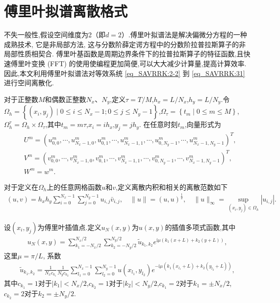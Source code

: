 \section{傅里叶拟谱离散格式}\label{Section_SAVRRK: 3}
不失一般性,假设空间维度为2（即$d=2$）.傅里叶拟谱法是解决偏微分方程的一种成熟技术, 它是非局部方法,
这与分数阶薛定谔方程中的分数阶拉普拉斯算子的非局部性质相契合.
傅里叶基函数是周期边界条件下的拉普拉斯算子的特征函数,且快速傅里叶变换 (FFT) 的使用使编程更加简便,可以大大减少计算量,提高计算效率.
因此,本文利用傅里叶拟谱法对等效系统 \eqref{eq_SAVRRK:2-2} 到 \eqref{eq_SAVRRK:31} 进行空间离散化.


对于正整数$M$和偶数正整数$N_{x}$、$N_{y}$,定义$\tau={T}/{M}$,$h_{x}={L}/{N_{x}}$,$h_{y}={L}/{N_{y}}$.令$\Omega_{h}=\left\{(x_{i}, y_{j}) \mid 0 \leq i \leq N_x-1;0 \leq j \leq N_y-1\right\}$,$\Omega_{\tau}=\left\{t_{m} \mid 0 \leq m \leq M\right\}$,$\Omega_{h}^{\tau}=\Omega_{h} \times \Omega_{\tau}$,其中$t_{m}=m \tau$,$x_{i}=i h_{x}$,$y_{j}=j h_{y}$.
在任意时刻$t_m$,向量形式为
\begin{align}\label{eq_SAVRRK:47}
&U^m=\left(u_{0,0}^m, \cdots, u_{N_{x}-1,0}^m, u_{0,1}^m, \cdots, u_{N_{x}-1,1}^m, \cdots, u_{0, N_{y}-1}^m, \cdots, u_{N_{x}-1, N_{y}-1}^m\right)^{T},\\
&V^m=\left(v_{0,0}^m, \cdots, v_{N_{x}-1,0}^m, v_{0,1}^m, \cdots, v_{N_{x}-1,1}^m, \cdots, v_{0, N_{y}-1}^m, \cdots, v_{N_{x}-1, N_{y}-1}^m\right)^{T},\\
&W^m=w^m.
\end{align}

对于定义在$\Omega_{h}$上的任意网格函数$u$和$v$,定义离散内积和相关的离散范数如下
\begin{align}\label{eq_SAVRRK:48}
(u, v)=h_{x} h_{y} \sum_{i=0}^{N_{x}-1} \sum_{j=0}^{N_{y}-1} u_{i, j} \bar{v}_{i, j},\quad\|u\|=(u, u)^{\frac{1}{2}},\quad\|u\|_{\infty}=\sup _{\left(x_{i}, y_{j}\right) \in \Omega_{h}}\left|u_{i, j}\right|.
\end{align}

设$\left(x_{i}, y_{j}\right)$为傅里叶插值点.定义$u_{N}(x, y)$为$u(x, y)$的插值多项式函数,其中
\begin{align}\label{eq_SAVRRK:50}
u_{N}(x, y)=\sum_{k_{1}=-N_{x} / 2}^{N_{x} / 2} \sum_{k_{2}=-N_{y} / 2}^{N_{y} / 2} \tilde{u}_{k_{1}, k_{2}} e^{\mathrm{i}\mu\left( k_{1} (x+L)+k_{2}(y+L)\right)},
\end{align}
这里$\mu={\pi}/{L}$, 系数
\begin{align}\label{eq_SAVRRK:51}
\tilde{u}_{k_{1}, k_{2}}=\frac{1}{N_{x} c_{k_{1}}} \frac{1}{N_{y} c_{k_{2}}} \sum_{l_1=0}^{N_{x}-1} \sum_{l_2=0}^{N_{y}-1} u(x_{l_1}, y_{l_2}) e^{-\mathrm{i}\mu\left( k_{1}(x_{l_1}+L)+k_{2}(y_{l_2}+L)\right)},
\end{align}
其中$c_{k_{1}}=1$对于$\left|k_{1}\right|<N_{x}/2$,$c_{k_{2}}=1$对于$\left|k_{2}\right|<N_{y}/2$,$c_{k_{1}}=2$对于$k_{1}=\pm N_{x}/2$,$c_{k_{2}}=2$对于$k_{2}=\pm N_{y}/2$.

